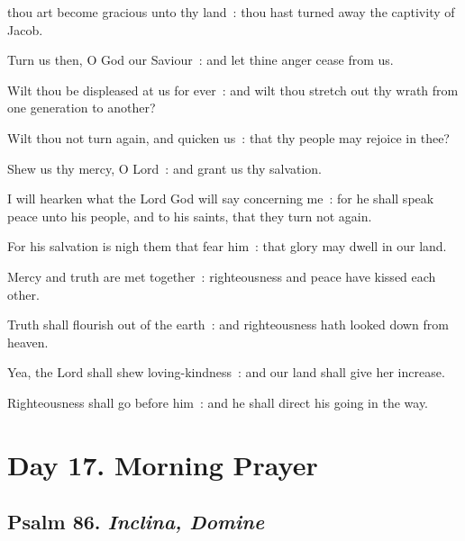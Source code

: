  thou art become gracious unto thy land~: thou hast turned away the captivity of Jacob.\par
{}
Turn us then, O God our Saviour~: and let thine anger cease from us.\par
{}Wilt thou be displeased at us for ever~: and wilt thou stretch out thy wrath from one generation to another?\par
{}Wilt thou not turn again, and quicken us~: that thy people may rejoice in thee?\par
{}Shew us thy mercy, O Lord~: and grant us thy salvation.\par
{}I will hearken what the Lord God will say concerning me~: for he shall speak peace unto his people, and to his saints, that they turn not again.\par
{}For his salvation is nigh them that fear him~: that glory may dwell in our land.\par
{}Mercy and truth are met together~: righteousness and peace have kissed each other.\par
{}Truth shall flourish out of the earth~: and righteousness hath looked down from heaven.\par
{}Yea, the Lord shall shew loving-kindness~: and our land shall give her increase.\par
{}Righteousness shall go before him~: and he shall direct his going in the way.\par

\section*{Day 17. Morning Prayer}

\subsection{Psalm 86. \textit{Inclina, Domine}}

